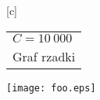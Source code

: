 \documentclass{article}
\begin{document}
\pagestyle{empty}
[c]{\begin{tabular}{@{}l@{}}
   $C = 10~000$\\
   Graf rzadki
\end{tabular}}
\texttt{[image: foo.eps]}
\end{document}
